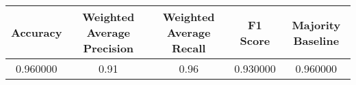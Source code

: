 \small
\begin{tabular}{ccccc}
\toprule
Accuracy & Weighted Average Precision & Weighted Average Recall & F1 Score & Majority Baseline \\
\midrule
0.960000 & 0.91 & 0.96 & 0.930000 & 0.960000 \\
\bottomrule
\end{tabular}

\normalsize